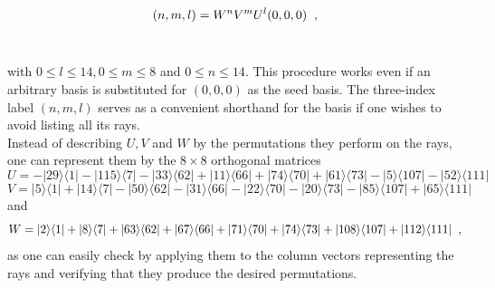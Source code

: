 \begin{equation}
(n,m,l) = W^{n}V^{m}U^{l}(0,0,0) \hspace{2mm} ,
\label{eq1}
\end{equation} \

\noindent
with $0 \leq l \leq 14, 0 \leq m \leq 8$ and $0 \leq n \leq 14$. This procedure works even if an arbitrary basis is substituted for $(0,0,0)$ as the seed basis. The three-index label $(n,m,l)$ serves as a convenient shorthand for the basis if one wishes to avoid listing all its rays. \\

Instead of describing $U,V$ and $W$ by the permutations they perform on the rays, one can represent them by the $8 \times 8$ orthogonal matrices
\begin{equation}
U = -|29\rangle \langle 1|-|115\rangle \langle 7|-|33\rangle \langle 62|+|11\rangle \langle 66|+|74\rangle \langle 70|+|61\rangle \langle 73|-|5\rangle \langle 107|-|52\rangle \langle 111|
\label{eq2a}
\end{equation}
\begin{equation}
V = |5\rangle \langle 1|+|14\rangle \langle 7|-|50\rangle \langle 62|-|31\rangle \langle 66|-|22\rangle \langle 70|-|20\rangle \langle 73|-|85\rangle \langle 107|+|65\rangle \langle 111|
\label{eq2b}
\end{equation}
and
\begin{equation}
W = |2\rangle \langle 1|+|8\rangle \langle 7|+|63\rangle \langle 62|+|67\rangle \langle 66|+|71\rangle \langle 70|+|74\rangle \langle 73|+|108\rangle \langle 107|+|112\rangle \langle 111| \hspace{2mm} ,
\label{eq2c}
\end{equation}
as one can easily check by applying them to the column vectors representing the rays and verifying that they produce the desired permutations.\\

